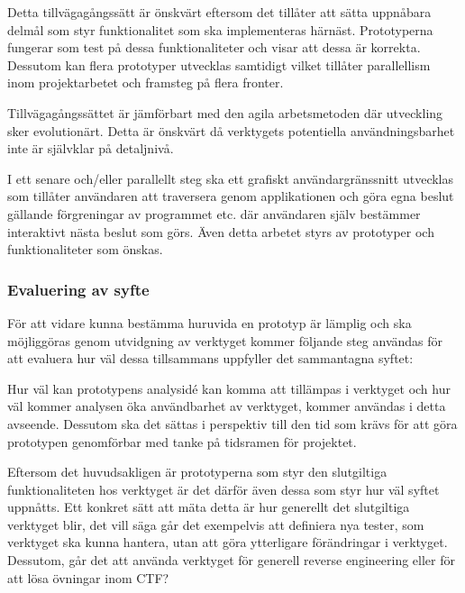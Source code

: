 Detta tillvägagångssätt är önskvärt eftersom det tillåter att sätta uppnåbara delmål som styr
funktionalitet som ska implementeras härnäst. Prototyperna fungerar som test på dessa
funktionaliteter och visar att dessa är korrekta. Dessutom kan flera prototyper 
utvecklas samtidigt vilket tillåter parallellism inom projektarbetet och
framsteg på flera fronter.

Tillvägagångssättet är jämförbart med den agila arbetsmetoden där utveckling sker 
evolutionärt. Detta är önskvärt då verktygets potentiella 
användningsbarhet inte är självklar på detaljnivå.

I ett senare och/eller parallellt steg ska ett grafiskt användargränssnitt
utvecklas som tillåter användaren att traversera genom applikationen och göra
egna beslut gällande förgreningar av programmet etc. där användaren själv
bestämmer interaktivt nästa beslut som görs. Även detta arbetet styrs av
prototyper och funktionaliteter som önskas.

\subsubsection{Evaluering av syfte}

För att vidare kunna bestämma huruvida en prototyp är lämplig och ska möjliggöras
genom utvidgning av verktyget kommer följande steg användas för att evaluera hur
väl dessa tillsammans uppfyller det sammantagna syftet:

Hur väl kan prototypens analysidé kan komma att tillämpas i verktyget och hur
väl kommer analysen öka användbarhet av verktyget, kommer användas i detta
avseende. Dessutom ska det sättas i perspektiv till den tid som krävs för att
göra prototypen genomförbar med tanke på tidsramen för projektet.

Eftersom det huvudsakligen är prototyperna som styr den slutgiltiga
funktionaliteten hos verktyget är det därför även dessa som styr hur väl syftet
uppnåtts. Ett konkret sätt att mäta detta är hur generellt det slutgiltiga
verktyget blir, det vill säga går det exempelvis att definiera nya tester, som verktyget
ska kunna hantera, utan att göra ytterligare förändringar i verktyget. Dessutom,
går det att använda verktyget för generell reverse engineering eller för att lösa övningar
inom CTF?




%
